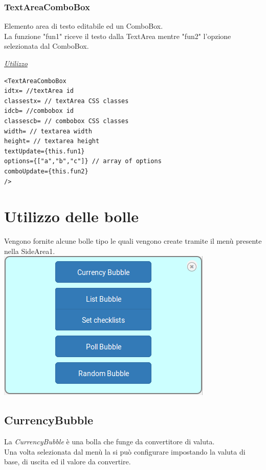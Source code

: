 \subsubsection{TextAreaComboBox}
Elemento area di testo editabile ed un ComboBox.\\
La funzione "fun1" riceve il testo dalla TextArea mentre "fun2" l'opzione selezionata dal ComboBox.
\begin{center}
\underline{\textit{Utilizzo}}
\begin{lstlisting}
<TextAreaComboBox
idtx= //textArea id
classestx= // textArea CSS classes
idcb= //combobox id
classescb= // combobox CSS classes
width= // textarea width
height= // textarea height
textUpdate={this.fun1}
options={["a","b","c"]} // array of options
comboUpdate={this.fun2}
/>
\end{lstlisting}
\end{center}

\section{Utilizzo delle bolle}
Vengono fornite alcune bolle tipo le quali vengono create tramite il menù presente nella SideArea1.\\

\includegraphics[scale=0.75]{img/menu.png}
\newpage
\subsection{CurrencyBubble}
La \textit{CurrencyBubble} è una bolla che funge da convertitore di valuta.
\\Una volta selezionata dal menù la si può configurare impostando la valuta di base, di uscita ed il valore da convertire.\\

